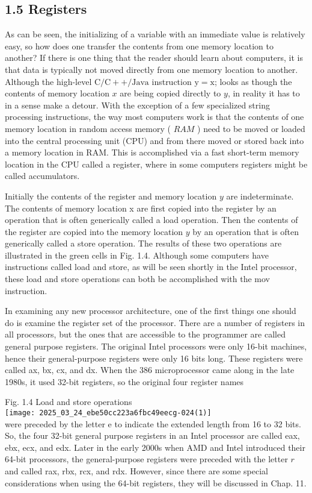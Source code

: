 \documentclass[10pt]{article}
\begin{document}
\subsection*{1.5 Registers}
As can be seen, the initializing of a variable with an immediate value is relatively easy, so how does one transfer the contents from one memory location to another? If there is one thing that the reader should learn about computers, it is that data is typically not moved directly from one memory location to another. Although the high-level $\mathrm{C} / \mathrm{C}++/ \mathrm{Java}$ instruction $\mathrm{y}=\mathrm{x}$; looks as though the contents of memory location $x$ are being copied directly to $y$, in reality it has to in a sense make a detour. With the exception of a few specialized string processing instructions, the way most computers work is that the contents of one memory location in random access memory ( $R A M$ ) need to be moved or loaded into the central processing unit (CPU) and from there moved or stored back into a memory location in RAM. This is accomplished via a fast short-term memory location in the CPU called a register, where in some computers registers might be called accumulators.

Initially the contents of the register and memory location $y$ are indeterminate. The contents of memory location x are first copied into the register by an operation that is often generically called a load operation. Then the contents of the register are copied into the memory location $y$ by an operation that is often generically called a store operation. The results of these two operations are illustrated in the green cells in Fig. 1.4. Although some computers have instructions called load and store, as will be seen shortly in the Intel processor, these load and store operations can both be accomplished with the mov instruction.

In examining any new processor architecture, one of the first things one should do is examine the register set of the processor. There are a number of registers in all processors, but the ones that are accessible to the programmer are called general purpose registers. The original Intel processors were only 16-bit machines, hence their general-purpose registers were only 16 bits long. These registers were called ax, bx, cx, and dx. When the 386 microprocessor came along in the late 1980s, it used 32-bit registers, so the original four register names

Fig. 1.4 Load and store operations\\
\texttt{[image: 2025\_03\_24\_ebe50cc223a6fbc49eecg-024(1)]}\\
were preceded by the letter e to indicate the extended length from 16 to 32 bits. So, the four 32-bit general purpose registers in an Intel processor are called eax, ebx, ecx, and edx. Later in the early 2000s when AMD and Intel introduced their 64-bit processors, the general-purpose registers were preceded with the letter $r$ and called rax, rbx, rcx, and rdx. However, since there are some special considerations when using the 64-bit registers, they will be discussed in Chap. 11.
\end{document}
